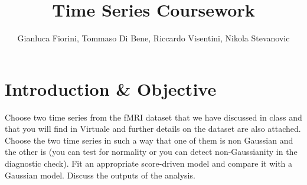 \documentclass{article}
\title{Time Series Coursework}
\author{Gianluca Fiorini, Tommaso Di Bene, Riccardo Visentini, Nikola Stevanovic}
\begin{document}
\maketitle

\section{Introduction \& Objective}
Choose two time series from the fMRI dataset that we have discussed in class and that you will find in Virtuale and further details on the dataset are also attached. Choose the two time series in such a way that one of them is non Gaussian and the other is (you can test for normality or you can detect non-Gaussianity in the diagnostic check).
Fit an appropriate score-driven model and compare it with a Gaussian model. Discuss the outputs of the analysis.
\end{document}
